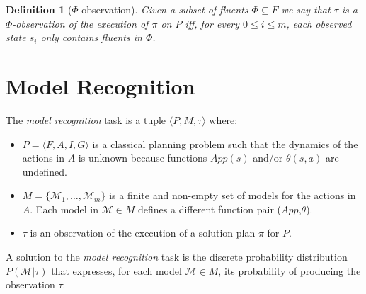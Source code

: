 \documentclass[letterpaper]{article} %
\newcommand{\tup}[1]{{\langle #1 \rangle}}
\newtheorem{definition}[theorem]{Definition}
\begin{document}
\begin{definition}[$\Phi$-observation]
Given a subset of fluents $\Phi\subseteq F$ we say that $\tau$ is a $\Phi$-observation of the execution of $\pi$ on $P$ iff, for every $0\leq i\leq m$, each observed state $s_i$ only contains fluents in $\Phi$.
\end{definition}



\section{Model Recognition}
\label{sec:recognition}
The {\em model recognition} task is a tuple $\tup{P,M,\tau}$ where:
\begin{itemize}
\item $P=\tup{F,A,I,G}$ is a classical planning problem such that the dynamics of the actions in $A$ is unknown because functions $App(s)$ and/or $\theta(s,a)$ are undefined.
\item $M=\{\mathcal{M}_1,\ldots,\mathcal{M}_m\}$ is a finite and non-empty set of models for the actions in $A$. Each model in $\mathcal{M}\in M$ defines a different function pair ($App$,$\theta$).
\item $\tau$ is an observation of the execution of a solution plan $\pi$ for $P$.
\end{itemize}
A solution to the {\em model recognition} task is the discrete probability distribution $P(\mathcal{M}|\tau)$ that expresses, for each model $\mathcal{M}\in M$, its probability of producing the observation $\tau$.
\end{document}
